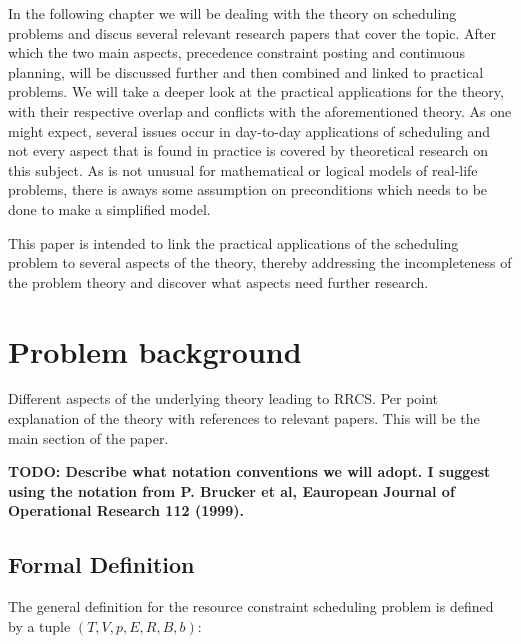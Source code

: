 \documentclass{article}
\newcommand{\TODO}[1]{{\color{red}\textbf{TODO: #1}}}
\begin{document}
In the following chapter we will be dealing with the theory on scheduling problems and discus several relevant research papers that cover the topic.
After which the two main aspects, precedence constraint posting and continuous planning, will be discussed further and then combined and linked to practical problems.
We will take a deeper look at the practical applications for the theory, with their respective overlap and conflicts with the aforementioned theory.
As one might expect, several issues occur in day-to-day applications of scheduling and not every aspect that is found in practice is covered by theoretical research on this subject.
As is not unusual for mathematical or logical models of real-life problems, there is aways some assumption on preconditions which needs to be done to make a simplified model.

This paper is intended to link the practical applications of the scheduling problem to several aspects of the theory, thereby addressing the incompleteness of the problem theory and discover what aspects need further research.


\newpage

\section{Problem background}

Different aspects of the underlying theory leading to RRCS.  Per point explanation of the theory with references to relevant papers. This will be the main section of the paper.

\TODO{Describe what notation conventions we will adopt. I suggest using the notation from P. Brucker et al, Eauropean Journal of Operational Research 112 (1999). }

\subsection{Formal Definition}
The general definition for the resource constraint scheduling problem is defined by a tuple $(T, V, p, E,R,B, b)$: \cite{brucker99}
\end{document}
